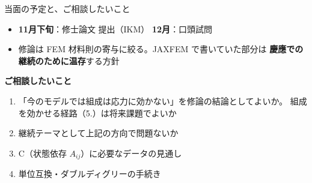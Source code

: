 \documentclass[aspectratio=169,11pt]{beamer}
\begin{document}
\begin{frame}{当面の予定と、ご相談したいこと}
\begin{itemize}\small
  \item \textbf{11月下旬}：修士論文 提出（IKM）\quad
        \textbf{12月}：口頭試問
  \item 修論は FEM 材料則の寄与に絞る。JAXFEM で書いていた部分は
        \textbf{慶應での継続のために温存}する方針
\end{itemize}
\vspace{8pt}
\begin{center}
\colorbox{c3!10}{\parbox{0.9\linewidth}{\small
\textbf{ご相談したいこと}
\begin{enumerate}\footnotesize
  \item 「今のモデルでは組成は応力に効かない」を修論の結論としてよいか。
        組成を効かせる経路（5.）は将来課題でよいか
  \item 継続テーマとして上記の方向で問題ないか
  \item C（状態依存 $A_{ij}$）に必要なデータの見通し
  \item 単位互換・ダブルディグリーの手続き
\end{enumerate}}}
\end{center}
\end{frame}
\end{document}
